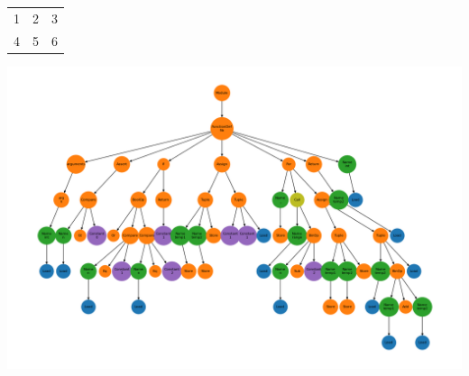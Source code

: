 \documentclass{article}
\begin{document}
\begin{tabular}{c|c|c}
\hline
1 & 2 & 3 \\
4 & 5 & 6 \\
\hline
\end{tabular}
\includegraphics[width=\linewidth]{artifacts/tree.png}
\end{document}
